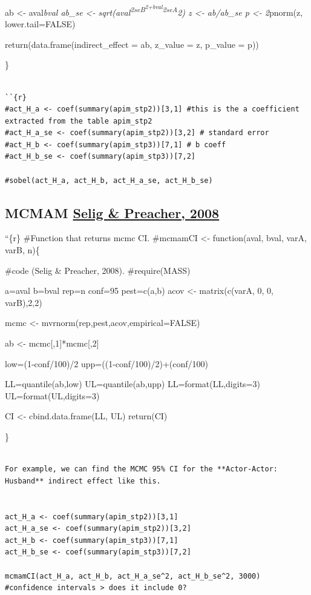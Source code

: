 \documentclass[
  english,
  man,floatsintext]{apa6}
\begin{document}
ab \textless- aval\emph{bval
ab\_se \textless- sqrt(aval\textsuperscript{2\emph{seB\textsuperscript{2+bval}2}seA}2)
z \textless- ab/ab\_se
p \textless- 2}pnorm(z, lower.tail=FALSE)

return(data.frame(indirect\_effect = ab, z\_value = z, p\_value = p))

\}

\begin{verbatim}

``{r}
#act_H_a <- coef(summary(apim_stp2))[3,1] #this is the a coefficient extracted from the table apim_stp2 
#act_H_a_se <- coef(summary(apim_stp2))[3,2] # standard error 
#act_H_b <- coef(summary(apim_stp3))[7,1] # b coeff
#act_H_b_se <- coef(summary(apim_stp3))[7,2]

#sobel(act_H_a, act_H_b, act_H_a_se, act_H_b_se)
\end{verbatim}

\hypertarget{mcmam-selig-preacher-2008}{%
\subsection{\texorpdfstring{MCMAM \href{http://www.quantpsy.org/medmc/medmc.htm}{Selig \& Preacher, 2008}}{MCMAM Selig \& Preacher, 2008}}\label{mcmam-selig-preacher-2008}}

``\{r\}
\#Function that returns mcmc CI.
\#mcmamCI \textless- function(aval, bval, varA, varB, n)\{

\#code (Selig \& Preacher, 2008).
\#require(MASS)

a=aval
b=bval
rep=n
conf=95
pest=c(a,b)
acov \textless- matrix(c(varA, 0, 0, varB),2,2)

mcmc \textless- mvrnorm(rep,pest,acov,empirical=FALSE)

ab \textless- mcmc{[},1{]}*mcmc{[},2{]}

low=(1-conf/100)/2
upp=((1-conf/100)/2)+(conf/100)

LL=quantile(ab,low)
UL=quantile(ab,upp)
LL=format(LL,digits=3)
UL=format(UL,digits=3)

CI \textless- cbind.data.frame(LL, UL)
return(CI)

\}

\begin{verbatim}

For example, we can find the MCMC 95% CI for the **Actor-Actor: Husband** indirect effect like this.


act_H_a <- coef(summary(apim_stp2))[3,1]
act_H_a_se <- coef(summary(apim_stp2))[3,2]
act_H_b <- coef(summary(apim_stp3))[7,1]
act_H_b_se <- coef(summary(apim_stp3))[7,2]

mcmamCI(act_H_a, act_H_b, act_H_a_se^2, act_H_b_se^2, 3000)
#confidence intervals > does it include 0?
\end{verbatim}
\end{document}

